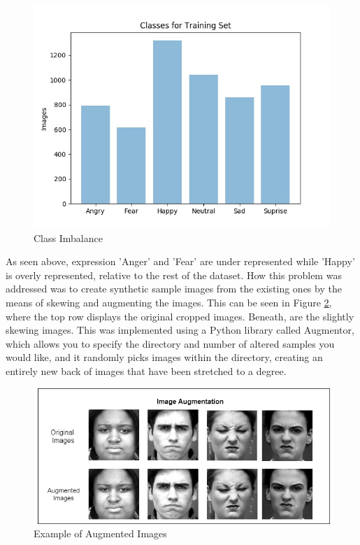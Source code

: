 \begin{figure}[ht]
	\begin{center}
		\advance\leftskip-3cm
		\advance\rightskip-3cm
		\includegraphics[keepaspectratio=true,scale=0.6]{__resources/implementation/imbalance.jpg}
		\caption{Class Imbalance}
		\label{imbal}
	\end{center}
\end{figure}\newpage
As seen above, expression 'Anger' and 'Fear' are under represented while 'Happy' is overly represented, relative to the rest of the dataset. How this problem was addressed was to create synthetic sample images from the existing ones by the means of skewing and augmenting the images. This can be seen in Figure \ref{augm}, where the top row displays the original cropped images. Beneath, are the slightly skewing images. This was implemented using a Python library called Augmentor, which allows you to specify the directory and number of altered samples you would like, and it randomly picks images within the directory, creating an entirely new back of images that have been stretched to a degree.
\begin{figure}[ht]
	\begin{center}
		\advance\leftskip-3cm
		\advance\rightskip-3cm
		\includegraphics[keepaspectratio=true,scale=0.6]{__resources/implementation/augmented-images.png}
		\caption{Example of Augmented Images}
		\label{augm}
	\end{center}
\end{figure}
\newpage

